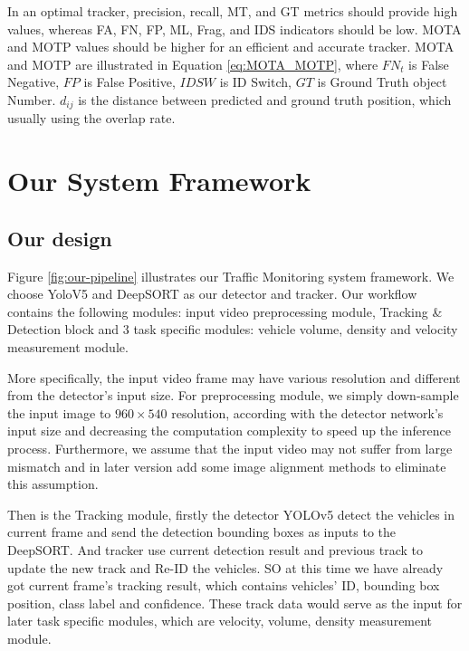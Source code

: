 \documentclass[10pt,twocolumn,letterpaper]{article}  %
\begin{document}
In an optimal tracker, precision, recall, MT, and GT metrics should provide high values, whereas FA, FN, FP, ML, Frag, and IDS indicators should be low. MOTA and MOTP values should be higher for an efficient and accurate tracker. MOTA and MOTP are illustrated in Equation \ref{eq:MOTA_MOTP}, where $FN_t$ is False Negative, $FP$ is False Positive, $IDSW$ is ID Switch, $GT$ is Ground Truth object Number. $d_{ij}$ is the distance between predicted and ground truth position, which usually using the overlap rate.


\section{Our System Framework}
\label{section:our-framework}
\subsection{Our design}
Figure \ref{fig:our-pipeline} illustrates our Traffic Monitoring system framework. We choose YoloV5 \cite{github_yolov5} and DeepSORT \cite{wojke2017simple} as our detector and tracker. Our workflow contains the following modules: input video preprocessing module, Tracking \& Detection block and 3 task specific modules: vehicle volume, density and velocity measurement module.


More specifically, the input video frame may have various resolution and different from the detector's input size. For preprocessing module, we simply down-sample the input image to $960 \times 540$ resolution, according with the detector network's input size and decreasing the computation complexity to speed up the inference process. Furthermore, we assume that the input video may not suffer from large mismatch and in later version add some image alignment methods to eliminate this assumption.

Then is the Tracking module, firstly the detector YOLOv5 \cite{github_yolov5} detect the vehicles in current frame and send the detection bounding boxes as inputs to the DeepSORT. And tracker use current detection result and previous track to update the new track and Re-ID the vehicles. SO at this time we have already got current frame's tracking result, which contains vehicles' ID, bounding box position, class label and confidence. These track data would serve as the input for later task specific modules, which are velocity, volume, density measurement module.
\end{document}
